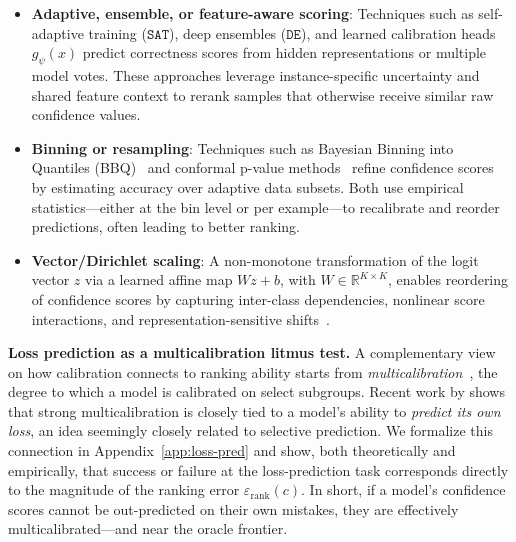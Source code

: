 \begin{itemize}
    \item \textbf{Adaptive, ensemble, or feature-aware scoring}:  
          Techniques such as self-adaptive training (\(\texttt{SAT}\)), deep ensembles (\(\texttt{DE}\)), and learned calibration heads \(g_\psi(x)\) predict correctness scores from hidden representations or multiple model votes. These approaches leverage instance-specific uncertainty and shared feature context to rerank samples that otherwise receive similar raw confidence values.
          
\item \textbf{Binning or resampling}:  
      Techniques such as Bayesian Binning into Quantiles (BBQ)~\citep{naeini2015obtaining} and conformal p-value methods~\citep{angelopoulos2021gentle} refine confidence scores by estimating accuracy over adaptive data subsets. Both use empirical statistics—either at the bin level or per example—to recalibrate and reorder predictions, often leading to better ranking.


\item \textbf{Vector/Dirichlet scaling}:  
      A non-monotone transformation of the logit vector \(z\) via a learned affine map \(Wz + b\), with \(W \in \mathbb{R}^{K \times K}\), enables reordering of confidence scores by capturing inter-class dependencies, nonlinear score interactions, and representation-sensitive shifts~\citep{kull2019beyond}.



\end{itemize}

\textbf{Loss prediction as a multicalibration litmus test.}
A complementary view on how calibration connects to ranking ability starts from \emph{multicalibration}~\citep{hebert2018multicalibration},
the degree to which a model is calibrated on select subgroups. Recent work by \citet{gollakota2025loss} shows that strong multicalibration is closely tied to a model's ability to \emph{predict its own loss}, an idea seemingly closely related to selective prediction. We formalize this connection in Appendix~\ref{app:loss-pred} and show, both theoretically and empirically, that success or failure at the loss-prediction task corresponds directly to the magnitude of the ranking error \(\varepsilon_{\text{rank}}(c)\). In short, if a model's confidence scores cannot be out-predicted on their own mistakes, they are effectively multicalibrated—and near the oracle frontier.

